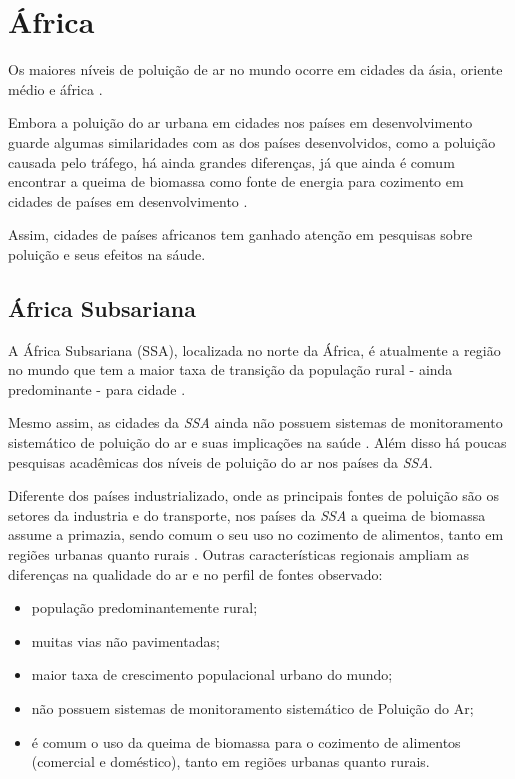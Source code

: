\section{África}

Os maiores níveis de poluição de ar no mundo ocorre
em cidades da ásia, oriente médio e áfrica \cite{brauer2012}.   

Embora a poluição do ar urbana em cidades nos países em 
desenvolvimento guarde algumas similaridades com as dos 
países desenvolvidos, como a poluição causada pelo tráfego, 
há ainda grandes diferenças, já que ainda é comum encontrar
a queima de biomassa como fonte de energia para cozimento em
cidades de países em desenvolvimento \cite{brauer2012}.

Assim, cidades de países africanos tem ganhado atenção em 
pesquisas sobre poluição e seus efeitos na sáude. 

\subsection{África Subsariana}

A África Subsariana (SSA), localizada no norte da África, é atualmente 
a região no mundo que tem a maior taxa de transição da população rural 
- ainda predominante - para cidade \citep{MONTGOMERY2008}.

Mesmo assim, as cidades da \textit{SSA} ainda não possuem sistemas de 
monitoramento sistemático de poluição do ar e suas implicações na saúde 
\citep{EZZATI2004}. 
Além disso há poucas pesquisas acadêmicas dos níveis de poluição do ar nos 
países da \textit{SSA}.

Diferente dos países industrializado, onde as principais fontes de poluição 
são os setores da industria e do transporte, nos países da \textit{SSA} a 
queima de biomassa assume a primazia, sendo comum o seu uso no cozimento 
de alimentos, tanto em regiões urbanas quanto rurais \citep{SMITH2004}. 
Outras características regionais ampliam as diferenças na qualidade do ar 
e no perfil de fontes observado:

\begin{itemize}
  \item população predominantemente rural;
  \item muitas vias não pavimentadas;
  \item maior taxa de crescimento populacional urbano do mundo;
  \item não possuem sistemas de monitoramento sistemático de Poluição do Ar;
  \item é comum o uso da queima de biomassa para o cozimento de alimentos  
        (comercial e doméstico), tanto em regiões urbanas quanto rurais.
\end{itemize}


